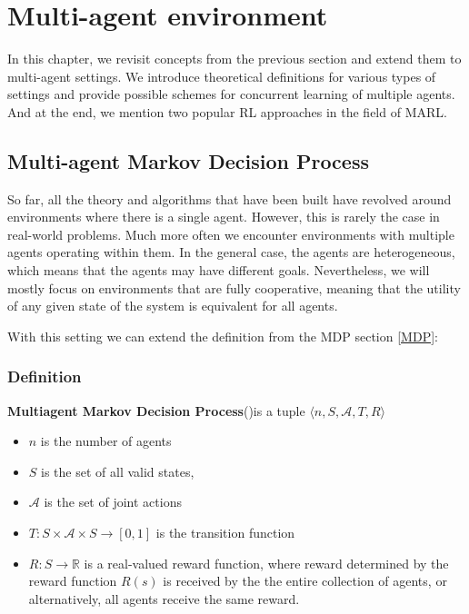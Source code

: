 \chapter{Multi-agent environment}\label{MAS}

In this chapter, we revisit concepts from the previous section and extend them to multi-agent settings.
We introduce theoretical definitions for various types of settings and provide possible schemes for concurrent learning of multiple agents.
And at the end, we mention two popular RL approaches in the field of MARL.

\section{Multi-agent Markov Decision Process}
So far, all the theory and algorithms that have been built have revolved around environments where there is a single agent.
However, this is rarely the case in real-world problems.
Much more often we encounter environments with multiple agents operating within them.
In the general case, the agents are heterogeneous, which means that the agents may have different goals.
Nevertheless, we will mostly focus on environments that are fully cooperative, meaning that the utility of any given state of the system is equivalent for all agents.

With this setting we can extend the definition from the MDP section \ref{MDP}:
\subsection*{Definition}
\textbf{Multiagent Markov Decision Process}(\cite{MMDP})is a tuple 
$\langle n, S, \mathcal{A}, T, R\rangle$
\begin{itemize}
    \item $n$ is the number of agents
    \item $S$ is the set of all valid states,
    \item $\mathcal{A} $ is the set of joint actions
    \item $T: S \times \mathcal{A} \times S \rightarrow [0,1]$ is the transition function
    \item $R: S  \rightarrow \mathbb{R}$ is a real-valued reward function, where reward determined by the reward function $R(s)$ is received by the the entire collection of agents, or alternatively, all agents receive the same reward.

\end{itemize}

